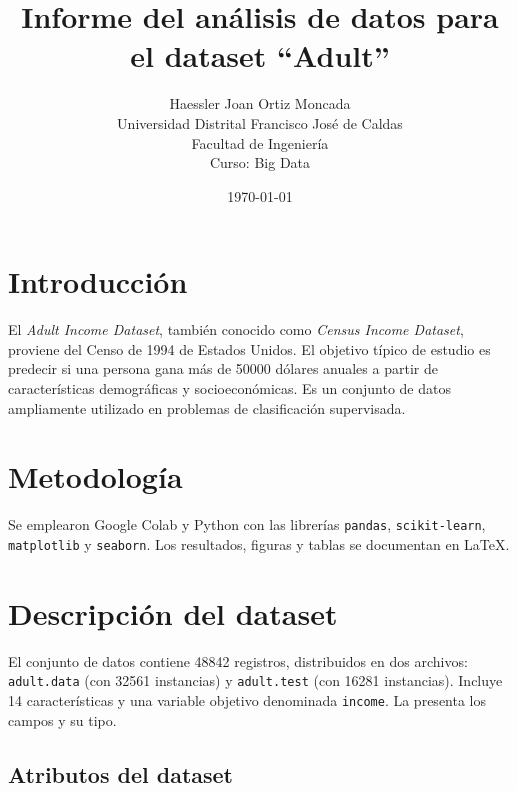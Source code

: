 \documentclass[12pt,a4paper]{article}
\title{\textbf{Informe del análisis de datos para el dataset ``Adult''}}
\author{Haessler Joan Ortiz Moncada \\[0.5cm]
        Universidad Distrital Francisco José de Caldas \\
        Facultad de Ingeniería \\
        Curso: Big Data}
\date{\today}
\begin{document}
\maketitle

\section{Introducción}
El \textit{Adult Income Dataset}, también conocido como \textit{Census Income Dataset}, 
proviene del Censo de 1994 de Estados Unidos. El objetivo típico de estudio es predecir 
si una persona gana más de \num{50000} dólares anuales a partir de características demográficas 
y socioeconómicas. Es un conjunto de datos ampliamente utilizado en problemas de clasificación supervisada.

\section{Metodología}
Se emplearon Google Colab y Python con las librerías \texttt{pandas}, \texttt{scikit-learn}, 
\texttt{matplotlib} y \texttt{seaborn}. Los resultados, figuras y tablas se documentan en \LaTeX.

\section{Descripción del dataset}
El conjunto de datos contiene \num{48842} registros, distribuidos en dos archivos: 
\texttt{adult.data} (con \num{32561} instancias) y \texttt{adult.test} (con \num{16281} instancias). 
Incluye 14 características y una variable objetivo denominada \texttt{income}. 
La  presenta los campos y su tipo.

\subsection{Atributos del dataset}
\end{document}
